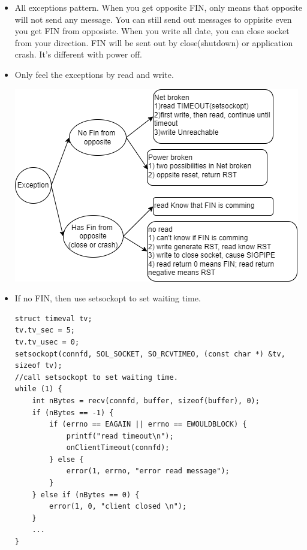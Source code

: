 \documentclass[a4paper,11pt,twoside]{book}
\begin{document}
\begin{itemize}
Functions read()/write() are the universal file descriptor functions working on all descriptors.
http use return as delimiter. That is why we use read\_line to parse message.
\begin{lstlisting}
int read_line(int fd, char *buf, int size) {
	int i = 0;
	char c = '\0';
	int n;
	while ((i < size - 1) && (c != '\n')) {
		n = recv(fd, &c, 1, 0);
		if (n > 0) {
			if (c == '\r') {
				n = recv(fd, &c, 1, MSG_PEEK);
				if ((n > 0) && (c == '\n'))
				recv(fd, &c, 1, 0);
				else
				c = '\n';
			}
			buf[i] = c;
			i++;
		} else
		c = '\n';
	}
	buf[i] = '\0';
	return (i);
}
\end{lstlisting}

\item All exceptions pattern. When you get opposite FIN, only means that opposite will not send any message.  You can still send out messages to oppisite even you get FIN from opposiste. When you write all date, you can close socket from your direction. FIN will be sent out by close(shutdown) or application crash.  It's different with power off. 

\item Only feel the exceptions by read and write. 
	\begin{center}
	\includegraphics[width=0.85\linewidth]{pics/net_ex.png}
\end{center}


\item If no FIN, then use setsockopt to set waiting time.
\begin{lstlisting}
struct timeval tv;
tv.tv_sec = 5;
tv.tv_usec = 0;
setsockopt(connfd, SOL_SOCKET, SO_RCVTIMEO, (const char *) &tv, sizeof tv);
//call setsockopt to set waiting time.
while (1) {
	int nBytes = recv(connfd, buffer, sizeof(buffer), 0);
	if (nBytes == -1) {
		if (errno == EAGAIN || errno == EWOULDBLOCK) {
			printf("read timeout\n");
			onClientTimeout(connfd);
		} else {
			error(1, errno, "error read message");
		}
	} else if (nBytes == 0) {
		error(1, 0, "client closed \n");
	}
	...
}
\end{lstlisting}


\end{itemize}
\end{document}
